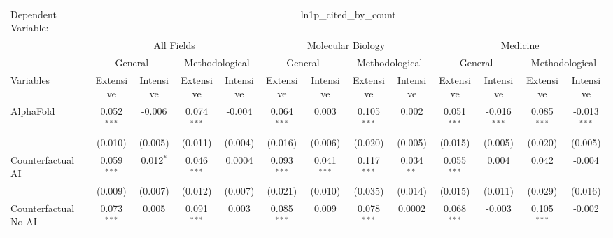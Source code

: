 \begingroup
\centering
\begin{tabular}{lcccccccccccc}
   \tabularnewline \midrule \midrule
   Dependent Variable: & \multicolumn{12}{c}{ln1p\_cited\_by\_count}\\
 & \multicolumn{4}{c}{All Fields} & \multicolumn{4}{c}{Molecular Biology} & \multicolumn{4}{c}{Medicine} \\
\cmidrule(lr){2-5} \cmidrule(lr){6-9} \cmidrule(lr){10-13}
 & \multicolumn{2}{c}{General} & \multicolumn{2}{c}{Methodological} & \multicolumn{2}{c}{General} & \multicolumn{2}{c}{Methodological} & \multicolumn{2}{c}{General} & \multicolumn{2}{c}{Methodological} \\
\cmidrule(lr){2-3} \cmidrule(lr){4-5} \cmidrule(lr){6-7} \cmidrule(lr){8-9} \cmidrule(lr){10-11} \cmidrule(lr){12-13}
Variables & \multicolumn{1}{c}{Extensive} & \multicolumn{1}{c}{Intensive} & \multicolumn{1}{c}{Extensive} & \multicolumn{1}{c}{Intensive} & \multicolumn{1}{c}{Extensive} & \multicolumn{1}{c}{Intensive} & \multicolumn{1}{c}{Extensive} & \multicolumn{1}{c}{Intensive} & \multicolumn{1}{c}{Extensive} & \multicolumn{1}{c}{Intensive} & \multicolumn{1}{c}{Extensive} & \multicolumn{1}{c}{Intensive} \\
\cmidrule(lr){1-1}\cmidrule(lr){2-2} \cmidrule(lr){3-3} \cmidrule(lr){4-4} \cmidrule(lr){5-5} \cmidrule(lr){6-6} \cmidrule(lr){7-7} \cmidrule(lr){8-8} \cmidrule(lr){9-9} \cmidrule(lr){10-10} \cmidrule(lr){11-11} \cmidrule(lr){12-12} \cmidrule(lr){13-13}
   AlphaFold                                & 0.052$^{***}$  & -0.006      & 0.074$^{***}$  & -0.004   & 0.064$^{***}$ & 0.003         & 0.105$^{***}$ & 0.002         & 0.051$^{***}$  & -0.016$^{***}$ & 0.085$^{***}$ & -0.013$^{***}$\\   
                                            & (0.010)        & (0.005)     & (0.011)        & (0.004)  & (0.016)       & (0.006)       & (0.020)       & (0.005)       & (0.015)        & (0.005)        & (0.020)       & (0.005)\\   
   Counterfactual AI                        & 0.059$^{***}$  & 0.012$^{*}$ & 0.046$^{***}$  & 0.0004   & 0.093$^{***}$ & 0.041$^{***}$ & 0.117$^{***}$ & 0.034$^{**}$  & 0.055$^{***}$  & 0.004          & 0.042         & -0.004\\   
                                            & (0.009)        & (0.007)     & (0.012)        & (0.007)  & (0.021)       & (0.010)       & (0.035)       & (0.014)       & (0.015)        & (0.011)        & (0.029)       & (0.016)\\   
   Counterfactual No AI                     & 0.073$^{***}$  & 0.005       & 0.091$^{***}$  & 0.003    & 0.085$^{***}$ & 0.009         & 0.078$^{***}$ & 0.0002        & 0.068$^{***}$  & -0.003         & 0.105$^{***}$ & -0.002\\   

\end{tabular}
